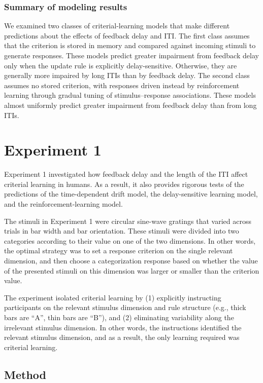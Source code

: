 \documentclass[doc, floatsintext]{apa7}
\begin{document}
\subsubsection{Summary of modeling results}
We examined two classes of criterial-learning models that
make different predictions about the effects of feedback
delay and ITI. The first class assumes that the criterion is
stored in memory and compared against incoming stimuli to
generate responses. These models predict greater impairment
from feedback delay only when the update rule is explicitly
delay-sensitive. Otherwise, they are generally more impaired
by long ITIs than by feedback delay. The second class
assumes no stored criterion, with responses driven instead
by reinforcement learning through gradual tuning of
stimulus–response associations. These models almost
uniformly predict greater impairment from feedback delay
than from long ITIs.

\section{Experiment 1}
Experiment 1 investigated how feedback delay and the length
of the ITI affect criterial learning in humans. As a result,
it also provides rigorous tests of the predictions of the
time-dependent drift model, the delay-sensitive learning
model, and the reinforcement-learning model.

The stimuli in Experiment 1 were circular sine-wave gratings
that varied across trials in bar width and bar orientation.
These stimuli were divided into two categories according to
their value on one of the two dimensions. In other words,
the optimal strategy was to set a response criterion on the
single relevant dimension, and then choose a categorization
response based on whether the value of the presented stimuli
on this dimension was larger or smaller than the criterion
value. 

The experiment isolated criterial learning by (1) explicitly
instructing participants on the relevant stimulus dimension
and rule structure (e.g., thick bars are ``A'', thin bars
are ``B''), and (2) eliminating variability along the
irrelevant stimulus dimension. In other words, the
instructions identified the relevant stimulus dimension, and
as a result, the only learning required was criterial
learning. 

\subsection{Method}
\end{document}
